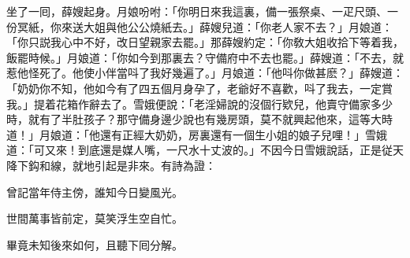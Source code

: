 坐了一囘，薛嫂起身。月娘吩咐：「你明日來我這裏，備一張祭桌、一疋尺頭、一份冥紙，你來送大姐與他公公燒紙去。」薛嫂兒道：「你老人家不去？」月娘道：「你只説我心中不好，改日望親家去罷。」那薛嫂約定：「你敎大姐收拾下等着我，飯罷時候。」月娘道：「你如今到那裏去？守備府中不去也罷。」薛嫂道：「不去，就惹他怪死了。他使小伴當呌了我好幾遍了。」月娘道：「他呌你做甚麽？」薛嫂道：「奶奶你不知，他如今有了四五個月身孕了，老爺好不喜歡，呌了我去，一定賞我。」提着花箱作辭去了。雪娥便說：「老淫婦說的沒個行欵兒，他賣守備家多少時，就有了半肚孩子？那守備身邊少說也有幾房頭，莫不就興起他來，這等大時道！」月娘道：「他還有正經大奶奶，房裏還有一個生小姐的娘子兒哩！」雪娥道：「可又來！到底還是媒人嘴，一尺水十丈波的。」不因今日雪娥說話，正是従天降下鈎和線，就地引起是非來。有詩為證：

\begin{myquote}
曾記當年侍主傍，誰知今日變風光。

世間萬事皆前定，莫笑浮生空自忙。
\end{myquote}

畢竟未知後來如何，且聽下囘分解。

